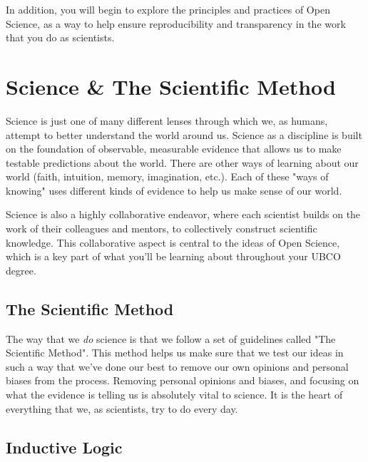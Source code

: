 \documentclass[
]{book}
\begin{document}
In addition, you will begin to explore the principles and practices of Open Science, as a way to help ensure reproducibility and transparency in the work that you do as scientists.

\hypertarget{science-the-scientific-method}{%
\chapter*{Science \& The Scientific Method}\label{science-the-scientific-method}}

Science is just one of many different lenses through which we, as humans, attempt to better understand the world around us. Science as a discipline is built on the foundation of observable, measurable evidence that allows us to make testable predictions about the world. There are other ways of learning about our world (faith, intuition, memory, imagination, etc.). Each of these "ways of knowing" uses different kinds of evidence to help us make sense of our world.

Science is also a highly collaborative endeavor, where each scientist builds on the work of their colleagues and mentors, to collectively construct scientific knowledge. This collaborative aspect is central to the ideas of Open Science, which is a key part of what you'll be learning about throughout your UBCO degree.

\hypertarget{the-scientific-method}{%
\section*{The Scientific Method}\label{the-scientific-method}}

The way that we \emph{do} science is that we follow a set of guidelines called "The Scientific Method". This method helps us make sure that we test our ideas in such a way that we've done our best to remove our own opinions and personal biases from the process. Removing personal opinions and biases, and focusing on what the evidence is telling us is absolutely vital to science. It is the heart of everything that we, as scientists, try to do every day.

\hypertarget{inductive-logic}{%
\section*{Inductive Logic}\label{inductive-logic}}
\end{document}
